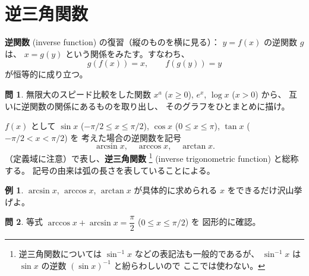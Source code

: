\documentclass[a4paper]{jsarticle}
\theoremstyle{definition}
\newtheorem{Example}[Theorem]{例}
\newtheorem{Exercise}{問}%
\theoremstyle{remark}
\begin{document}
\bigskip
\bigskip
\section{逆三角関数}
{\bf 逆関数} (inverse function) の復習（縦のものを横に見る）：
$y = f(x)$ の逆関数 $g$ は、
$x = g(y)$ という関係をみたす。すなわち、
\[
g(f(x)) = x,\qquad f(g(y)) = y
\]
が恒等的に成り立つ。

\begin{Exercise}
  無限大のスピード比較をした関数 $x^a$ ($x \geq 0$), $e^x$, $\log x$ ($x>0$) から、
  互いに逆関数の関係にあるものを取り出し、
  そのグラフをひとまとめに描け。
\end{Exercise}

$f(x)$ として $\sin x$ ($-\pi/2 \leq x \leq \pi/2$),
$\cos x$ ($0 \leq x \leq \pi$), $\tan x$ ($-\pi/2 < x < \pi/2$) を
考えた場合の逆関数を記号
\[
\arcsin x,\quad \arccos x,\quad \arctan x.
\]
（定義域に注意）で表し、\textbf{逆三角関数} 
\footnote{逆三角関数については $\sin^{-1}x$ などの表記法も一般的であるが、
$\sin^{-1}x$ は $\sin x$ の逆数 $(\sin x)^{-1}$ と紛らわしいので
ここでは使わない。} (inverse trigonometric function)
と総称する。
記号の由来は弧の長さを表していることによる。%

\bigskip
\begin{figure}[h]
\hspace{-1cm}

\caption{}
\end{figure}

\begin{Example}
$\arcsin x$, $\arccos x$, $\arctan x$ が具体的に求められる $x$ をできるだけ沢山挙げよ。
\end{Example}

\begin{figure}[htbp]
\centering 

\caption{}
\end{figure}


\bigskip
\begin{Exercise}
等式 $\arccos x + \arcsin x = \dfrac{\pi}{2}$ 
($0 \leq x \leq \pi/2$) を
図形的に確認。
\end{Exercise}
\end{document}
